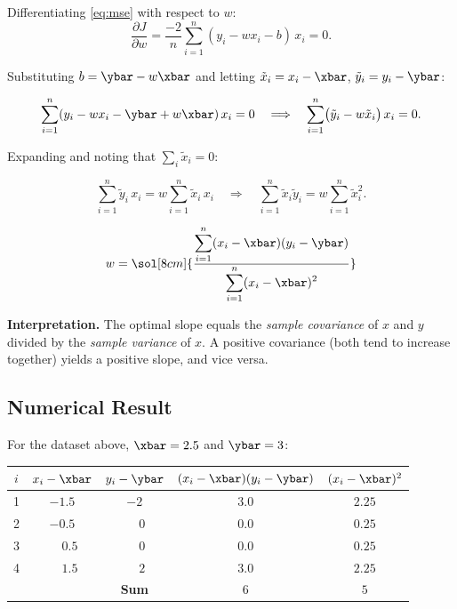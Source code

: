 \documentclass[12pt, a4paper]{article}
\begin{document}
Differentiating \eqref{eq:mse} with respect to $w$:
\[
  \frac{\partial J}{\partial w}
  = \frac{-2}{n}\sum_{i=1}^{n}(y_i - wx_i - b)\,x_i = 0.
\]

Substituting $b = \ybar - w\xbar$ and letting $\tilde{x}_i = x_i - \xbar$,
$\tilde{y}_i = y_i - \ybar$:

\[
  \sum_{i=1}^{n}(y_i - wx_i - \ybar + w\xbar)\,x_i = 0
  \quad\Longrightarrow\quad
  \sum_{i=1}^{n}\bigl(\tilde{y}_i - w\tilde{x}_i\bigr)\,x_i = 0.
\]

Expanding and noting that $\sum_i \tilde{x}_i = 0$:

\[
  \sum_{i=1}^{n}\tilde{y}_i\, x_i = w\sum_{i=1}^{n}\tilde{x}_i\, x_i
  \quad\Longrightarrow\quad
  \sum_{i=1}^{n}\tilde{x}_i\tilde{y}_i = w\sum_{i=1}^{n}\tilde{x}_i^2.
\]

\begin{resultbox}
  \[
    w = \sol[8cm]{\frac{\displaystyle\sum_{i=1}^{n}(x_i - \xbar)(y_i - \ybar)}
      {\displaystyle\sum_{i=1}^{n}(x_i - \xbar)^2}}
  \]
\end{resultbox}

\begin{notebox}
  \textbf{Interpretation.} The optimal slope equals the \emph{sample covariance}
  of $x$ and $y$ divided by the \emph{sample variance} of $x$.
  A positive covariance (both tend to increase together) yields a positive slope,
  and vice versa.
\end{notebox}

\subsection{Numerical Result}

For the dataset above, $\xbar = 2.5$ and $\ybar = 3$:

\begin{center}
  \renewcommand{\arraystretch}{1.3}
  \begin{tabular}{ccccc}
    \toprule
    $i$ & $x_i - \xbar$            & $y_i - \ybar$
        & $(x_i-\xbar)(y_i-\ybar)$ & $(x_i-\xbar)^2$                  \\
    \midrule
    1   & $-1.5$                   & $-2$            & $3.0$ & $2.25$ \\
    2   & $-0.5$                   & $\phantom{-}0$  & $0.0$ & $0.25$ \\
    3   & $\phantom{-}0.5$         & $\phantom{-}0$  & $0.0$ & $0.25$ \\
    4   & $\phantom{-}1.5$         & $\phantom{-}2$  & $3.0$ & $2.25$ \\
    \midrule
        &                          & \textbf{Sum}    & $6$   & $5$    \\
    \bottomrule
  \end{tabular}
\end{center}
\end{document}
